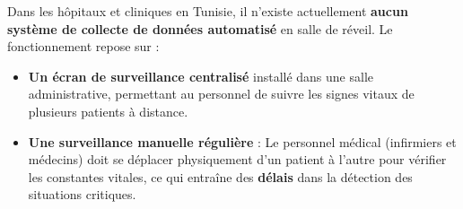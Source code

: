 Dans les hôpitaux et cliniques en Tunisie, il n’existe actuellement \textbf{aucun système de collecte de données automatisé} en salle de réveil. Le fonctionnement repose sur :
\begin{itemize}
    \item \textbf{Un écran de surveillance centralisé} installé dans une salle administrative, permettant au personnel de suivre les signes vitaux de plusieurs patients à distance.
    \item \textbf{Une surveillance manuelle régulière} : Le personnel médical (infirmiers et médecins) doit se déplacer physiquement d’un patient à l’autre pour vérifier les constantes vitales, ce qui entraîne des \textbf{délais} dans la détection des situations critiques.
\end{itemize}